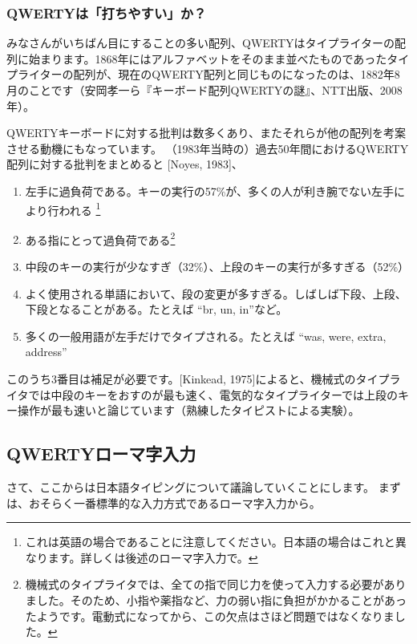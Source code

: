 \subsubsection*{QWERTYは「打ちやすい」か？}

みなさんがいちばん目にすることの多い配列、QWERTYはタイプライターの配列に始まります。1868年にはアルファベットをそのまま並べたものであったタイプライターの配列が、現在のQWERTY配列と同じものになったのは、1882年8月のことです（安岡孝一ら『キーボード配列QWERTYの謎』、NTT出版、2008年）。

QWERTYキーボードに対する批判は数多くあり、またそれらが他の配列を考案させる動機にもなっています。
（1983年当時の）過去50年間におけるQWERTY配列に対する批判をまとめると%
[Noyes, 1983]、

\begin{enumerate}
\item 左手に過負荷である。キーの実行の57\%が、多くの人が利き腕でない左手により行われる%
    \footnote{これは英語の場合であることに注意してください。日本語の場合はこれと異なります。詳しくは後述のローマ字入力で。}
\item ある指にとって過負荷である\footnote{機械式のタイプライタでは、全ての指で同じ力を使って入力する必要がありました。そのため、小指や薬指など、力の弱い指に負担がかかることがあったようです。電動式になってから、この欠点はさほど問題ではなくなりました。}
\item 中段のキーの実行が少なすぎ（32\%）、上段のキーの実行が多すぎる（52\%）
\item よく使用される単語において、段の変更が多すぎる。しばしば下段、上段、下段となることがある。たとえば ``br, un, in''など。
\item 多くの一般用語が左手だけでタイプされる。たとえば ``was, were, extra, address''
\end{enumerate}

このうち3番目は補足が必要です。[Kinkead, 1975]によると、機械式のタイプライタでは中段のキーをおすのが最も速く、電気的なタイプライターでは上段のキー操作が最も速いと論じています（熟練したタイピストによる実験）。

\subsection{QWERTYローマ字入力}

さて、ここからは日本語タイピングについて議論していくことにします。
まずは、おそらく一番標準的な入力方式であるローマ字入力から。

